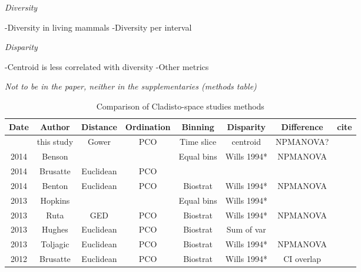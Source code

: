 \documentclass[12pt,letterpaper]{article}
\renewcommand{\subsection}[1]{%
\bigskip
\begin{center}
\begin{large}
\normalfont\itshape #1
\end{large}
\end{center}}
\begin{document}
\subsection{Diversity}
-Diversity in living mammals
-Diversity per interval

\subsection{Disparity}
-Centroid is less correlated with diversity
-Other metrics

\subsection{Not to be in the paper, neither in the supplementaries (methods table)}

\begin{table}[ht]
\caption{Comparison of Cladisto-space studies methods}
\centering
\begin{tabular}{cccccccc}
  \hline
    Date & Author      & Distance  & Ordination & Binning    & Disparity   & Difference & cite \\ %
  \hline
         & this study  & Gower     & PCO        & Time slice & centroid    & NPMANOVA?  & \\
    2014 & Benson      &           &            & Equal bins & Wills 1994* & NPMANOVA   & \cite{bensonfaunal2014} \\
    2014 & Brusatte    & Euclidean & PCO        &            &             &            & \cite{brusattegradual2014} \\
    2014 & Benton      & Euclidean & PCO        & Biostrat   & Wills 1994* & NPMANOVA   & \cite{bentonmodels2014} \\
    2013 & Hopkins     &           &            & Equal bins & Wills 1994* &            & \cite{hopkinsdecoupling2013} \\             
    2013 & Ruta        & GED       & PCO        & Biostrat   & Wills 1994* & NPMANOVA   & \cite{ruta2013} \\
    2013 & Hughes      & Euclidean & PCO        & Biostrat   & Sum of var  &            & \cite{Hughes20082013} \\
    2013 & Toljagic    & Euclidean & PCO        & Biostrat   & Wills 1994* & NPMANOVA   & \cite{toljagictriassic-jurassic2013} \\
    2012 & Brusatte    & Euclidean & PCO        & Biostrat   & Wills 1994* & CI overlap & \cite{brusattedinosaur2012} \\

\end{tabular}
\end{table}
\end{document}
